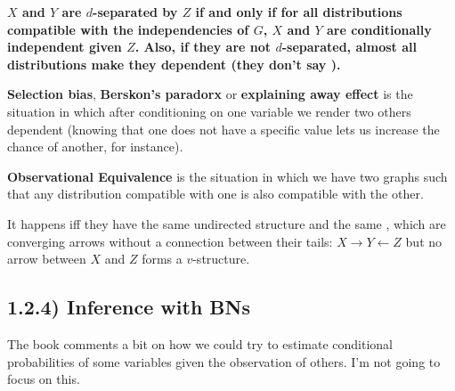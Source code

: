 \textbf{$X$ and $Y$ are $d$-separated by $Z$ if and only if for all distributions compatible with the independencies of $G$, $X$ and $Y$ are conditionally independent given $Z$. Also, if they are not $d$-separated, almost all distributions make they dependent (they don't say ).}


\textbf{Selection bias}, \textbf{Berskon's paradorx} or \textbf{explaining away effect} is the situation in which after conditioning on one variable we render two others dependent (knowing that one does not have a specific value lets us increase the chance of another, for instance).

\textbf{Observational Equivalence} is the situation in which we have two graphs such that any distribution compatible with one is also compatible with the other.

It happens iff they have the same undirected structure and the same , which are converging arrows without a connection between their tails: $X \rightarrow Y \leftarrow Z$ but no arrow between $X$ and $Z$ forms a $v$-structure.


\subsection{1.2.4) Inference with BNs}

The book comments a bit on how we could try to estimate conditional probabilities of some variables given the observation of others. I'm not going to focus on this.


